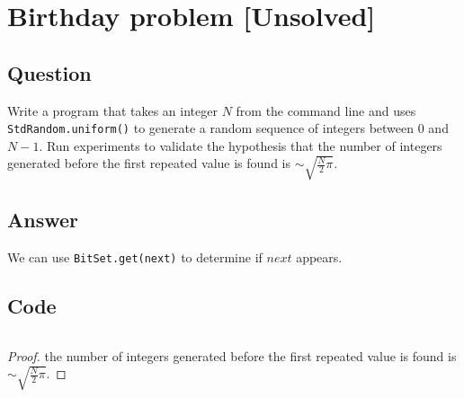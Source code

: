 \section{Birthday problem [Unsolved]}

\subsection*{Question}
Write a program that takes an integer $N$ from the command
line and uses \texttt{StdRandom.uniform()} to generate a random sequence of integers
between 0 and $N-1$. Run experiments to validate the hypothesis that the number of
integers generated before the first repeated value is found is $\sim \sqrt{\frac{N}{2}\pi}$.

\subsection*{Answer}
We can use \texttt{BitSet.get(next)} to determine if $next$ appears.

\subsection*{Code}
\inputminted{java}{puzzles/birthday_problem/BirthdayProblem.java}
\begin{proof}
    the number of integers generated before the first repeated
    value is found is $\sim \sqrt{\frac{N}{2}\pi}$.
\end{proof}
